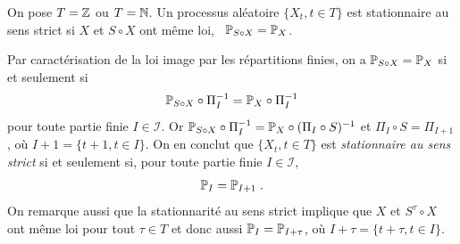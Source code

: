\begin{definition}
On pose $T=\mathbb{Z}$ ou $T=\mathbb{N}$.
Un processus al\'eatoire $\{X_t, t\in T \}$ est stationnaire au sens strict si $X$ et $S\circ X$ ont m\^{e}me loi, \ie\
 $\mathbb{P}_{S\circ X}=\mathbb{P}_X$.
\end{definition}

Par caract\'erisation de la loi image par les r\'epartitions finies, on a  $\mathbb{P}_{S\circ X}=\mathbb{P}_X$ si et seulement si
$$
\mathbb{P}_{S\circ X}\circ\Pi_I^{-1}=\mathbb{P}_X\circ\Pi_I^{-1}
$$
pour toute partie finie $I \in \mathcal{I}$.  Or $\mathbb{P}_{S\circ X}\circ\Pi_I^{-1}=\mathbb{P}_X\circ(\Pi_I\circ S)^{-1}$
et $\Pi_I\circ S=\Pi_{I+1}$, o\`u $I + 1 = \{ t+1, t \in I \}$.
On en conclut que  $\{X_t, t\in T\}$ est \emph{stationnaire au sens strict} si et seulement si, pour toute partie finie $I \in
\mathcal{I}$,
$$
\mathbb{P}_I=\mathbb{P}_{I+1} \; .
$$
On remarque aussi que la stationnarit\'e au sens strict implique que  $X$ et $S^\tau\circ X$ ont m\^{e}me loi pour tout $\tau\in T$
et donc aussi $\mathbb{P}_I=\mathbb{P}_{I+\tau}$, o\`u $I + \tau = \{ t+\tau, t \in I \}$.

